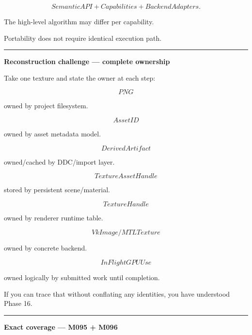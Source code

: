 \[
SemanticAPI
+
Capabilities
+
BackendAdapters.
\]

The high-level algorithm may differ per capability.

Portability does not require identical execution path.

\begin{center}\rule{0.5\linewidth}{0.5pt}\end{center}

\textbf{Reconstruction challenge --- complete ownership}

Take one texture and state the owner at each step:

\[
PNG
\]

owned by project filesystem.

\[
AssetID
\]

owned by asset metadata model.

\[
DerivedArtifact
\]

owned/cached by DDC/import layer.

\[
TextureAssetHandle
\]

stored by persistent scene/material.

\[
TextureHandle
\]

owned by renderer runtime table.

\[
VkImage/MTLTexture
\]

owned by concrete backend.

\[
InFlightGPUUse
\]

owned logically by submitted work until completion.

If you can trace that without conflating any identities, you have understood Phase 16.

\begin{center}\rule{0.5\linewidth}{0.5pt}\end{center}

\textbf{Exact coverage --- M095 + M096}

